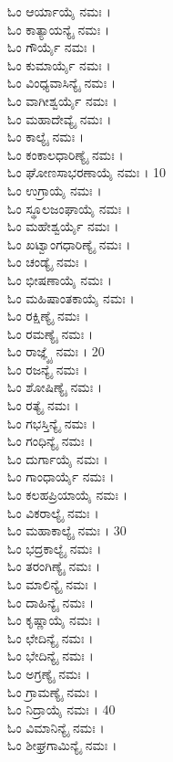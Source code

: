 \begin{multicols}{2} ಓಂ ಆರ್ಯಾಯೈ ನಮಃ ।\\
ಓಂ ಕಾತ್ಯಾಯನ್ಯೈ ನಮಃ ।\\
ಓಂ ಗೌರ್ಯೈ ನಮಃ ।\\
ಓಂ ಕುಮಾರ್ಯೈ ನಮಃ ।\\
ಓಂ ವಿಂಧ್ಯವಾಸಿನ್ಯೈ ನಮಃ ।\\
ಓಂ ವಾಗೀಶ್ವರ್ಯೈ ನಮಃ ।\\
ಓಂ ಮಹಾದೇವ್ಯೈ ನಮಃ ।\\
ಓಂ ಕಾಲ್ಯೈ ನಮಃ ।\\
ಓಂ ಕಂಕಾಲಧಾರಿಣ್ಯೈ ನಮಃ ।\\
ಓಂ ಘೋಣಸಾಭರಣಾಯೈ ನಮಃ । 10\\
ಓಂ ಉಗ್ರಾಯೈ ನಮಃ ।\\
ಓಂ ಸ್ಥೂಲಜಂಘಾಯೈ ನಮಃ ।\\
ಓಂ ಮಹೇಶ್ವರ್ಯೈ ನಮಃ ।\\
ಓಂ ಖಟ್ವಾಂಗಧಾರಿಣ್ಯೈ ನಮಃ ।\\
ಓಂ ಚಂಡ್ಯೈ ನಮಃ ।\\
ಓಂ ಭೀಷಣಾಯೈ ನಮಃ ।\\
ಓಂ ಮಹಿಷಾಂತಕಾಯೈ ನಮಃ ।\\
ಓಂ ರಕ್ಷಿಣ್ಯೈ ನಮಃ ।\\
ಓಂ ರಮಣ್ಯೈ ನಮಃ ।\\
ಓಂ ರಾಜ್ಞ್ಯೈ ನಮಃ । 20\\
ಓಂ ರಜನ್ಯೈ ನಮಃ ।\\
ಓಂ ಶೋಷಿಣ್ಯೈ ನಮಃ ।\\
ಓಂ ರತ್ಯೈ ನಮಃ ।\\
ಓಂ ಗಭಸ್ತಿನ್ಯೈ ನಮಃ ।\\
ಓಂ ಗಂಧಿನ್ಯೈ ನಮಃ ।\\
ಓಂ ದುರ್ಗಾಯೈ ನಮಃ ।\\
ಓಂ ಗಾಂಧಾರ್ಯೈ ನಮಃ ।\\
ಓಂ ಕಲಹಪ್ರಿಯಾಯೈ ನಮಃ ।\\
ಓಂ ವಿಕರಾಲ್ಯೈ ನಮಃ ।\\
ಓಂ ಮಹಾಕಾಲ್ಯೈ ನಮಃ । 30\\
ಓಂ ಭದ್ರಕಾಲ್ಯೈ ನಮಃ ।\\
ಓಂ ತರಂಗಿಣ್ಯೈ ನಮಃ ।\\
ಓಂ ಮಾಲಿನ್ಯೈ ನಮಃ ।\\
ಓಂ ದಾಹಿನ್ಯೈ ನಮಃ ।\\
ಓಂ ಕೃಷ್ಣಾಯೈ ನಮಃ ।\\
ಓಂ ಛೇದಿನ್ಯೈ ನಮಃ ।\\
ಓಂ ಭೇದಿನ್ಯೈ ನಮಃ ।\\
ಓಂ ಅಗ್ರಣ್ಯೈ ನಮಃ ।\\
ಓಂ ಗ್ರಾಮಣ್ಯೈ ನಮಃ ।\\
ಓಂ ನಿದ್ರಾಯೈ ನಮಃ । 40\\
ಓಂ ವಿಮಾನಿನ್ಯೈ ನಮಃ ।\\
ಓಂ ಶೀಘ್ರಗಾಮಿನ್ಯೈ ನಮಃ ।\\

\end{multicols}
